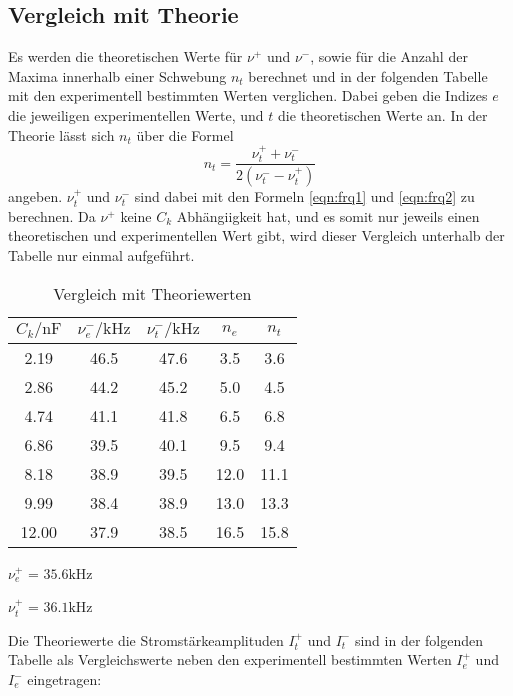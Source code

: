 \subsection{Vergleich mit Theorie}
Es werden die theoretischen Werte für $\nu^+$ und $\nu^-$, sowie für die Anzahl der Maxima innerhalb einer Schwebung $n_t$
berechnet und in der folgenden Tabelle mit den experimentell bestimmten Werten verglichen. Dabei geben die Indizes $e$ die jeweiligen
experimentellen Werte, und $t$ die theoretischen Werte an. 
In der Theorie lässt sich $n_t$ über die Formel \begin{equation}
    n_t = \frac{\nu_{t}^{+} + \nu_{t}^{-}}{2(\nu_{t}^{-} - \nu_{t}^{+})}
\end{equation}
angeben. $\nu_{t}^{+}$ und $\nu_{t}^{-}$ sind dabei mit den Formeln \ref{eqn:frq1} und \ref{eqn:frq2} zu berechnen.
Da $\nu^+$ keine $C_k$ Abhängiigkeit hat, und es somit nur jeweils einen theoretischen und experimentellen Wert gibt, wird
dieser Vergleich unterhalb der Tabelle nur einmal aufgeführt.
\begin{table}
    \centering
    \caption{Vergleich mit Theoriewerten}
    \label{tab:theo}
    \begin{tabular}{c c c c c}
    \toprule
    $C_k / \si{\nano\farad}$ & $\nu_{e}^- / \si{\kilo\hertz}$ & $\nu_{t}^- / \si{\kilo\hertz}$ & $n_e$ & $n_t$ \\
    \midrule
     2.19 & 46.5 & 47.6 &  3.5 &  3.6 \\
     2.86 & 44.2 & 45.2 &  5.0 &  4.5 \\
     4.74 & 41.1 & 41.8 &  6.5 &  6.8 \\
     6.86 & 39.5 & 40.1 &  9.5 &  9.4 \\
     8.18 & 38.9 & 39.5 & 12.0 & 11.1 \\
     9.99 & 38.4 & 38.9 & 13.0 & 13.3 \\
    12.00 & 37.9 & 38.5 & 16.5 & 15.8 \\
    \bottomrule
    \end{tabular}
\end{table}

$\nu_e^+$ = $35.6 \si{\kilo\hertz}$

$\nu_t^+$ = $36.1 \si{\kilo\hertz}$

Die Theoriewerte die Stromstärkeamplituden $I_t^+$ und $I_t^-$ sind in der folgenden Tabelle als Vergleichswerte
neben den experimentell bestimmten Werten $I_e^+$ und $I_e^-$ eingetragen: 

